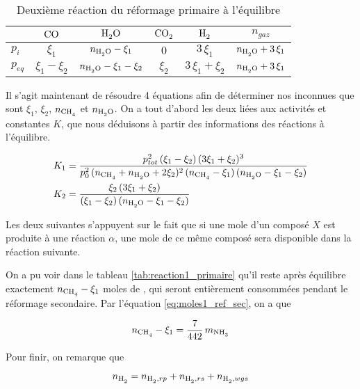 \begin{table}
	\centering
	\begin{tabular}{l|c|c|c|c|c}
		 & $\ce{CO}$ & $\ce{H2O}$ & $\ce{CO2}$ & $\ce{H2}$ & $n_{gaz}$ \\
		\hline
		$p_{i}$ & $\xi_1$ & $n_{\ce{H2O}} - \xi_1$ & $0$ & $3 \, \xi_1$ &
		$n_{\ce{H2O}} + 3 \, \xi_1$ \\
		$p_{eq}$ & $\xi_1 - \xi_2$ & $n_{\ce{H2O}} - \xi_1 - \xi_2$ & 
		$\xi_2$ & $3 \, \xi_1 + \xi_2$ & $n_{\ce{H2O}} + 3 \, \xi_1 $\\
	\end{tabular}
	\caption{Deuxième réaction du réformage primaire à l'équilibre}
	\label{tab:reaction2_primaire}
\end{table}

Il s'agit maintenant de résoudre 4 équations afin de déterminer nos inconnues que 
sont $\xi_1$, $\xi_2$, $n_{\ce{CH4}}$ et $n_{\ce{H2O}}$. 
On a tout d'abord les deux liées aux activités et constantes $K$, que nous déduisons
à partir des informations des réactions à l'équilibre.

\begin{align}
	K_1 &= \frac{p_{tot}^2 \, (\xi_1 - \xi_2) \, (3 \xi_1 + \xi_2)^3}
	{p_{0}^2 \, (n_{\ce{CH4}} + n_{\ce{H2O}} + 2 \xi_2)^2 \, (n_{\ce{CH4}} - 
	\xi_1) \, (n_{\ce{H2O}} - \xi_1 - \xi_2 )} 
	\label{eq:systeme1} \\
	K_2 &= \frac{\xi_2 \, (3 \xi_1 + \xi_2)}
	{(\xi_1 - \xi_2) \, (n_{\ce{H2O}} - \xi_1 - \xi_2)}
	\label{eq:systeme2}
\end{align}

Les deux suivantes s'appuyent sur le fait que si une mole d'un composé $X$ est
produite à une réaction $\alpha$, une mole de ce même composé sera disponible 
dans la réaction suivante.

On a pu voir dans le tableau \ref{tab:reaction1_primaire} qu'il reste après 
équilibre exactement $n_{\ce{CH4}} - \xi_1$ moles de , qui seront 
entièrement consommées pendant le réformage secondaire. 
Par l'équation \ref{eq:moles1_ref_sec}, on a que 

\begin{equation}
	n_{\ce{CH4}} - \xi_1 = \frac{7}{442} \, m_{\ce{NH3}}
	\label{eq:systeme3}
\end{equation}

Pour finir, on remarque que 

\begin{equation*}
	n_{\ce{H2}} = n_{\ce{H2}, rp} + n_{\ce{H2}, rs} + n_{\ce{H2}, wgs}
\end{equation*}

